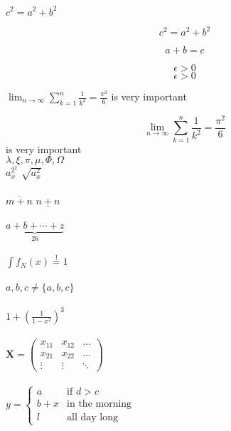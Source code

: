 \documentclass{report}
\begin{document}
$c^2=a^2+b^2$
 
\begin{displaymath} c^{2}=a^{2}+b^{2} \end{displaymath}

\[a+b=c\]

\begin{equation} \label{eq:eps} \epsilon > 0 \end{equation} 
\begin{equation} \label{eq:eps} \epsilon > 0 \end{equation} 

$\lim_{n \to \infty} \sum_{k=1}^n \frac{1}{k^2} = \frac{\pi^2}{6}$ is very important

\begin{displaymath} \lim_{n \to \infty} \sum_{k=1}^n \frac{1}{k^2} = \frac{\pi^2}{6} \end{displaymath} is very important \\


$\lambda,\xi,\pi,\mu,\Phi,\Omega$ \\

$a^{2^2}_{x}$
$\sqrt{a^{2}_{x}}$ \\ \\
$\overline{m+n}$
$\underline{n+n}$ \\ \\

$\underbrace{ a+b+\cdots+z }_{26}$ \\ \\

$\int f_N(x) \stackrel{!}{=} 1 $ \\ \\

${a,b,c}\neq\{a,b,c\}$ \\ \\
$1 + \left( \frac{1}{ 1-x^{2} } \right) ^3$ \\ \\



$\mathbf{X} = \left( \begin{array}{ccc} x_{11} & x_{12} & \ldots \\ x_{21} & x_{22} & \ldots \\ \vdots & \vdots & \ddots \end{array} \right) $ \\ \\
$ y = \left\{ \begin{array}{ll} a & \textrm{if $d>c$}\\ b+x & \textrm{in the morning}\\ l & \textrm{all day long} \end{array} \right.$
\end{document}
